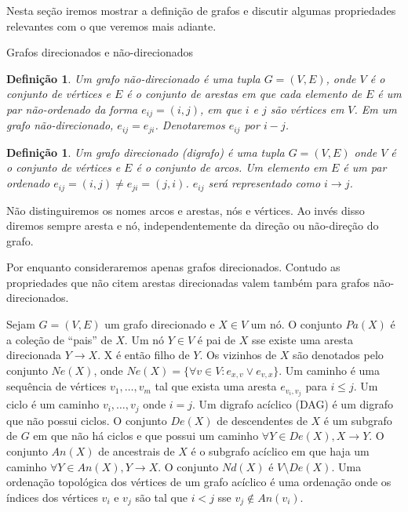 \documentclass{amsart}
\makeatletter
\def\subsection{\@startsection{subsection}{3}%
  \z@{.5\linespacing\@plus.7\linespacing}{.1\linespacing}%
  {\normalfont\itshape}}
\theoremstyle{plain}
\newcounter{dummy-def}\numberwithin{dummy-def}{subsection}
\newtheorem{definition}[dummy-def]{Definição}
\newcounter{dummy-thm}\numberwithin{dummy-thm}{subsection}
\newcounter{dummy-prop}\numberwithin{dummy-prop}{subsection}
\newcounter{dummy-ex}\numberwithin{dummy-ex}{subsection}
\newcounter{dummy-eg}\numberwithin{dummy-eg}{subsection}
\numberwithin{equation}{subsection}
\makeatother
\begin{document}
Nesta seção iremos mostrar a definição de grafos e discutir algumas propriedades relevantes com o
que veremos mais adiante.

\subsection{Grafos direcionados e não-direcionados}

\begin{definition}
  Um grafo não-direcionado é uma tupla $G=(V,E)$, onde $V$ é o conjunto de vértices e $E$ é o
  conjunto de arestas em que cada elemento de $E$ é um par não-ordenado da forma $e_{ij}=(i,j)$,
  em que $i$ e $j$ são vértices em $V$. Em um grafo não-direcionado, $e_{ij}=e_{ji}$. Denotaremos
  $e_{ij}$ por $i-j$.
\end{definition}

\begin{definition}
  Um grafo direcionado (digrafo) é uma tupla $G=(V,E)$ onde $V$ é o conjunto de vértices e $E$ é o
  conjunto de arcos. Um elemento em $E$ é um par ordenado $e_{ij}=(i,j)\neq e_{ji}=(j,i)$. $e_{ij}$
  será representado como $i\to j$.
\end{definition}

Não distinguiremos os nomes arcos e arestas, nós e vértices. Ao invés disso diremos sempre aresta
e nó, independentemente da direção ou não-direção do grafo.

Por enquanto consideraremos apenas grafos direcionados. Contudo as propriedades que não citem
arestas direcionadas valem também para grafos não-direcionados.

Sejam $G=(V,E)$ um grafo direcionado e $X\in V$ um nó. O conjunto $Pa(X)$ é a coleção de ``pais''
de $X$. Um nó $Y\in V$ é pai de $X$ sse existe uma aresta direcionada $Y\to X$. X é então filho de
$Y$. Os vizinhos de $X$ são denotados pelo conjunto $Ne(X)$, onde $Ne(X)=\{\forall v\in V : e_{x,v}
\vee e_{v,x}\}$. Um caminho é uma sequência de vértices $v_1,\ldots,v_m$ tal que exista uma aresta
$e_{v_i,v_j}$ para $i\leq j$. Um ciclo é um caminho $v_i,\ldots,v_j$ onde $i=j$. Um digrafo
acíclico (DAG) é um digrafo que não possui ciclos. O conjunto $De(X)$ de descendentes de $X$ é um
subgrafo de $G$ em que não há ciclos e que possui um caminho $\forall Y\in De(X), X\to Y$. O
conjunto $An(X)$ de ancestrais de $X$ é o subgrafo acíclico em que haja um caminho $\forall Y\in
An(X), Y\to X$. O conjunto $Nd(X)$ é $V\setminus De(X)$. Uma ordenação topológica dos vértices de
um grafo acíclico é uma ordenação onde os índices dos vértices $v_i$ e $v_j$ são tal que $i<j$ sse
$v_j\not\in An(v_i)$.
\end{document}
